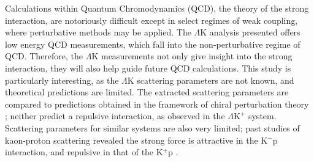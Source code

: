 \documentclass[ALICE,manyauthors]{cernphprep}
\newcommand{\mt}{$m_{\mathrm{T}}$\xspace}
\newcommand{\LamK}{$\Lambda$K\xspace}
\newcommand{\LamKchP}{$\Lambda\mathrm{K^{+}}$\xspace}
\begin{document}
Calculations within Quantum Chromodynamics (QCD), the theory of the strong interaction, are notoriously difficult except in select regimes of weak coupling, where perturbative methods may be applied. 
The \LamK analysis presented offers low energy QCD measurements, which fall into the non-perturbative regime of QCD.
Therefore, the \LamK measurements not only give insight into the strong interaction, they will also help guide future QCD calculations.
This study is particularly interesting, as the \LamK scattering parameters are not known, and theoretical predictions are limited.
The extracted scattering parameters are compared to predictions obtained in the framework of chiral perturbation theory \cite{Liu:2006xja,Mai:2009ce}; neither predict a repulsive interaction, as observed in the \LamKchP system.
Scattering parameters for similar systems are also very limited; past studies of kaon-proton scattering revealed the strong force is attractive in the K$^{-}$p interaction, and repulsive in that of the K$^{+}$p \cite{Humphrey:1962zz, Hadjimichef:2002xe, Ikeda:2012au}.

\begin{comment}
Femtoscopic analyses of pions, kaons, and protons have revealed a trend of decreasing source radii with increasing transverse mass \cite{Adam:2015vja}, which, for identical particle pairs, is defined as $m_{\mathrm{T}}^{2} = m^{2} + k_{\mathrm{T}}^{2}$, where $k_{\mathrm{T}} = \frac{1}{2}|\mathbf{p}_{\mathrm{T},1} + \mathbf{p}_{\mathrm{T},2}|$.  
This effect is interpreted as a signature of hydrodynamic flow in the heavy-ion collisions \cite{Akkelin:1995gh}. 
The exponent for \mt-scaling can be shown analytically to be $-\frac{1}{2}$ for case of a one-dimensional longitudinal hydrodynamic expansion with negligible transverse flow and common freeze-out characteristics, regardless of particle species.
This has lead to an idea of universal \mt-scaling for different particle species.
However, it is unclear how the picture changes with significant transverse flow, viscosity corrections, and hadronic rescattering.
Additionally, the scaling observed in models exists separately for the three-dimensional radii in the Longitudinally Co-Moving System (LCMS), and will at best only be approximate in the Pair Rest Frame (PRF) \cite{Adam:2015vja, Kisiel:2014upa}.

The radii extracted from the femtoscopic study are larger than one would except from naively following the trends set forth in the identical particle analyses.  
However, when dealing with non-identical particles, such as in the present case with \LamK pairs, one should not necessarily expect the exact same trend. 
In such cases, the pair emission source, measured through femtoscopy, is the superposition of two single-particle sources, each with its own unique size, shape, and space-time position within the medium.
Although the single-particle sources should abide by the approximate \mt-scaling, the pair sources generally will not.
\end{comment}
\end{document}
